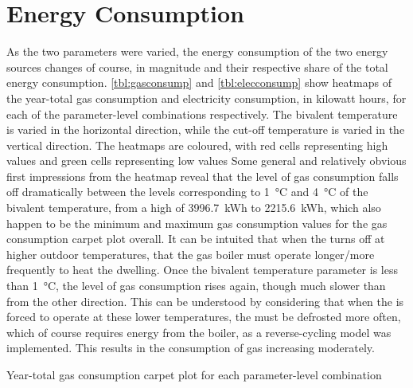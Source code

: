 \section{Energy Consumption}
As the two parameters were varied, the energy consumption of the two energy sources changes of course, in magnitude and their respective share of the total energy consumption. \cref{tbl:gasconsump} and \cref{tbl:elecconsump} show heatmaps of the year-total gas consumption and electricity consumption, in kilowatt hours, for each of the parameter-level combinations respectively. The bivalent temperature is varied in the horizontal direction, while the cut-off temperature is varied in the vertical direction. The heatmaps are coloured, with red cells representing high values and green cells representing low values Some general and relatively obvious first impressions from the heatmap reveal that the level of gas consumption falls off dramatically between the levels corresponding to \qty{1}{\celsius} and \qty{4}{\celsius} of the bivalent temperature, from a high of \qty{3996.7}{\kWh} to \qty{2215.6}{\kWh}, which also happen to be the minimum and maximum gas consumption values for the gas consumption carpet plot overall. It can be intuited that when the \HP turns off at higher outdoor temperatures, that the gas boiler must operate longer/more frequently to heat the dwelling. Once the bivalent temperature parameter is less than \qty{1}{\celsius}, the level of gas consumption rises again, though much slower than from the other direction. This can be understood by considering that when the \HP is forced to operate at these lower temperatures, the \HP must be defrosted more often, which of course requires energy from the boiler, as a reverse-cycling model was implemented. This results in the consumption of gas increasing moderately. 



\begin{table}[htb]
    \footnotesize
    \centering
    \caption{Year-total gas consumption carpet plot for each parameter-level combination}
    \label{tbl:gasconsump}
\end{table}

